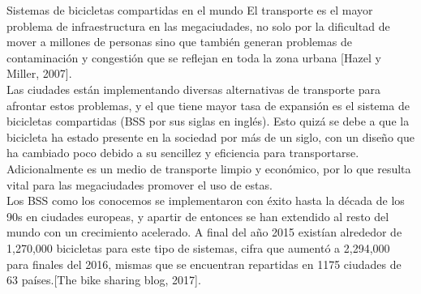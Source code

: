 \documentclass[12pt,spanish]{article}
\makeatletter
\newcounter{numberofruns}%
\newcommand{\secfig@@writecounterstage}{1}%
\newcommand{\secfig@@readcounterstage}{2}%
\newcommand{\secfig@@writecontentstage}{2}%
\newlength{\loftsectionbeforeskipamount}%
\newlength{\loftsectionafterskipamount}%
\newcommand{\loftsectionbeforeskip}{\vspace{\loftsectionbeforeskipamount}}%
\newcommand{\loftsectionafterskip}{\vspace{\loftsectionafterskipamount}}%
\newcounter{totalsections}
\let\LaTeXStandardSection\section%
\newcommand{\unstarredsection@@noopt}[1]{%
	\unstarredsection@@opt[#1]{#1}%
}%
\newcommand{\StoreCounterValue}[1]{%
	\immediate\expandafter\write\csname #1countsout\endcsname{%
		\number\value{#1}%
	}%
}%
\newcommand{\LoadAllStoredCounterValues}[1]{%
	\ifnumequal{\number\value{#1}}{\secfig@@readcounterstage}{%
		\read\figurecountsin to \lastsectionfigures
		\read\tablecountsin  to \lastsectiontables%
	}{}%
}%
\newcommand{\loftsectioncontentsline}[1]{%
	\loftsectionbeforeskip\textbf{\large\thesection~#1}\loftsectionafterskip
}%
\newcommand{\unstarredsection@@opt}[2][]{%
	\iftoggle{SectionsInLOFT}{%
		\FloatBarrier%
		\gdef\lastsectionfigures{0}%
		\gdef\lastsectiontables{0}%
		\ifnumequal{\number\value{numberofruns}}{\secfig@@writecounterstage}{%
			\gdef\lastsectionfigures{\number\value{figure}}%
			\gdef\lastsectionfigures{\number\value{table}}%
			\ifnumequal{\number\value{totalsections}}{0}{%
			}{%
				\StoreCounterValue{figure}%
				\StoreCounterValue{table}%
			}%
		}{%
			\LoadAllStoredCounterValues{numberofruns}%
		}%
	}{%
	}%
	\LaTeXStandardSection[#1]{#2}%
	\iftoggle{SectionsInLOFT}{%
		\ifnumequal{\number\value{numberofruns}}{\secfig@@writecontentstage}{%
			\ifnumgreater{\lastsectionfigures}{0}{%
				\typeout{Writing a section entry for \thesection{}to the LOF}%
				\iftoggle{AppendixSectionsInLOF}{%
					\addtocontents{lof}{\loftsectioncontentsline{#1}}%
				}{}%
			}{%
				\typeout{No figures in \thesection!}
			}%
			\ifnumgreater{\lastsectiontables}{0}{%
				\typeout{Writing a section entry for \thesection{}to the LOT}%
				\iftoggle{AppendixSectionsInLOT}{%
					\addtocontents{lot}{\loftsectioncontentsline{#1}}%
				}{}%
			}{%
				\typeout{No tables in \thesection!}
			}%
		}{}%
	}{%
	}%
}%
\newcommand{\unstarredsection}{%
	\@ifnextchar[{%
		\unstarredsection@@opt%
	}{%
		\unstarredsection@@noopt%
	}%
}%
\newcommand{\starredsection}[1]{%
	\LaTeXStandardSection*{#1}%
}%
\renewcommand{\section}{%
	\@ifstar{%
		\starredsection%
	}{%
		\unstarredsection%
	}%
}%
\makeatother
\begin{document}
	\section{Sistemas de bicicletas compartidas en el mundo}
 	El transporte es el mayor problema de infraestructura en las megaciudades, no solo por la dificultad de mover a millones de personas sino que también generan problemas de contaminación y congestión que se reflejan en toda la zona urbana [Hazel y Miller, 2007].\\
 	Las ciudades están implementando diversas alternativas de transporte para afrontar estos problemas, y el que tiene mayor tasa de expansión es el sistema de bicicletas compartidas (BSS por sus siglas en inglés). Esto quizá se debe a que la bicicleta ha estado presente en la sociedad por más de un siglo, con un diseño que ha cambiado poco debido a su sencillez y eficiencia para transportarse. Adicionalmente es un medio de transporte limpio y económico, por lo que resulta vital para las megaciudades promover el uso de estas.\\
 	Los BSS como los conocemos se implementaron con éxito hasta la década de los 90s en ciudades europeas, y apartir de entonces se han extendido al resto del mundo con un crecimiento acelerado. A final del año 2015 existían alrededor de 1,270,000 bicicletas para este tipo de sistemas, cifra que aumentó a 2,294,000 para finales del 2016, mismas que se encuentran repartidas en 1175 ciudades de 63 países.[The bike sharing blog, 2017].\\\\
\end{document}
